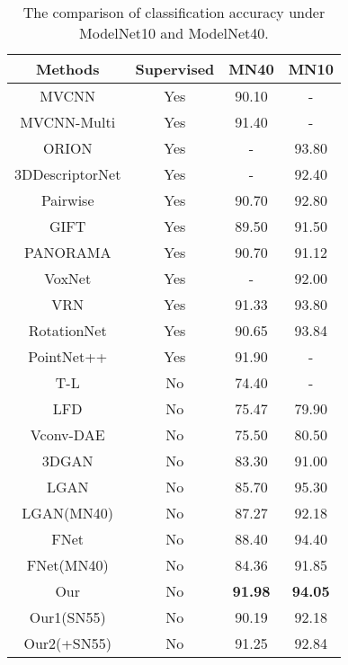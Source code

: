 \documentclass[letterpaper]{article} \usepackage{aaai19}  \usepackage{times}  \usepackage{helvet}  \usepackage{courier}  \usepackage{url}  \usepackage{graphicx}
\begin{document}
\begin{table}
  \caption{The comparison of classification accuracy under ModelNet10 and ModelNet40.}
  \label{table:comparison}
  \centering
  \begin{tabular}{cccc}
    \hline
    Methods & Supervised  & MN40 & MN10 \\
    \hline
    MVCNN & Yes & 90.10 & - \\
    MVCNN-Multi & Yes & 91.40 & -\\
    ORION & Yes & - & 93.80 \\
    3DDescriptorNet & Yes & - & 92.40 \\
    Pairwise & Yes & 90.70 & 92.80\\
    GIFT & Yes & 89.50 & 91.50 \\
    PANORAMA & Yes & 90.70 & 91.12 \\
    VoxNet & Yes & - & 92.00\\
    VRN& Yes & 91.33 &93.80 \\
    RotationNet& Yes & 90.65 & 93.84 \\
    PointNet++ & Yes & 91.90 & -   \\
    \hline
    T-L & No & 74.40 & -\\
    LFD& No & 75.47 & 79.90 \\
    Vconv-DAE & No & 75.50 & 80.50 \\
    3DGAN& No & 83.30& 91.00 \\
    LGAN & No & 85.70 & 95.30 \\
    LGAN(MN40) & No & 87.27 & 92.18 \\
    FNet & No& 88.40 & 94.40\\
    FNet(MN40) & No& 84.36 & 91.85\\
    \hline
    Our & No & \textbf{91.98} & \textbf{94.05} \\
    Our1(SN55) & No & 90.19 & 92.18 \\
    Our2(+SN55) & No & 91.25 & 92.84 \\
    \hline
  \end{tabular}
\end{table}
\end{document}

